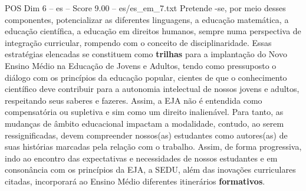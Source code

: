\begin{textsample}{POS Dim 6 – es – Score 9.00 – es/es\_em\_7.txt}
Pretende -se, por meio desses componentes, potencializar as diferentes linguagens, a educação matemática, a educação científica, a educação em direitos humanos, sempre numa perspectiva de integração curricular, rompendo com o conceito de disciplinaridade.
Essas estratégias elencadas se constituem como \textbf{trilhas} para a implantação do Novo Ensino Médio na Educação de Jovens e Adultos, tendo como pressuposto o diálogo com os princípios da educação popular, cientes de que o conhecimento científico deve contribuir para a autonomia intelectual de nossos jovens e adultos, respeitando seus saberes e fazeres.
Assim, a EJA não é entendida como compensatória ou supletiva e sim como um direito inalienável.
Para tanto, as mudanças de âmbito educacional impactam a modalidade, contudo, ao serem ressignificadas, devem compreender nossos(as) estudantes como autores(as) de suas histórias marcadas pela relação com o trabalho.
Assim, de forma progressiva, indo ao encontro das expectativas e necessidades de nossos estudantes e em consonância com os princípios da EJA, a SEDU, além das inovações curriculares citadas, incorporará ao Ensino Médio diferentes itinerários \textbf{formativos}.

\end{textsample}
